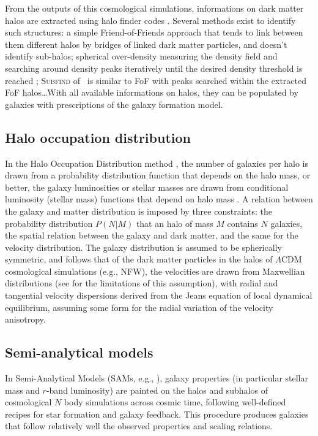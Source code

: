 From the outputs of this cosmological simulations, informations on dark matter
halos are extracted using halo finder codes \citep{KK+09, Tweed+09,
Planelles+10}. Several methods exist to identify such structures: a simple
Friend-of-Friends approach \citep{Davis+85} that tends to link between them
different halos by bridges of linked dark matter particles, and doesn't
identify sub-halos; spherical over-density measuring the density field and
searching around density peaks iteratively until the desired density threshold
is reached \citep{PS+74}; \textsc{Subfind} of~\cite{Springel+01} is similar to
FoF with peaks searched within the extracted FoF halos\ldots With all
available informations on halos, they can be populated by galaxies with
prescriptions of the galaxy formation model.

\subsection{Halo occupation distribution}
\label{sub:halo_occupation_distribution}

In the Halo Occupation Distribution method \citep{MS02,BW02,Zehavi+11}, the
number of galaxies per halo is drawn from a probability distribution function
that depends on the halo mass, or better, the galaxy luminosities or stellar
masses are drawn from conditional luminosity (stellar mass) functions that
depend on halo mass \citep{YMvdB03}. A relation between the galaxy and matter
distribution is imposed by three constraints: the probability distribution $P
\left(N|M\right)$ that an halo of mass $M$ contains $N$ galaxies, the spatial
relation between the galaxy and dark matter, and the same for the velocity
distribution. The galaxy distribution is assumed to be spherically symmetric,
and follows that of the dark matter particles in the halos of $\Lambda$CDM
cosmological simulations (e.g., NFW), the velocities are drawn from Maxwellian
distributions (see \citealp{Beraldo+14} for the limitations of this
assumption), with radial and tangential velocity dispersions derived from the
Jeans equation of local dynamical equilibrium, assuming some form for the
radial variation of the velocity anisotropy.

\subsection{Semi-analytical models}
\label{sub:semi_analytical_models}

In  Semi-Analytical Models (SAMs, e.g., \citealp{RQPR97,KCDW99}), galaxy
properties (in particular stellar mass and $r$-band luminosity) are painted on
the halos and subhalos of cosmological $N$ body simulations across cosmic time,
following well-defined recipes for star formation and galaxy feedback.  This
procedure produces galaxies that follow relatively well the observed properties
and scaling relations.

